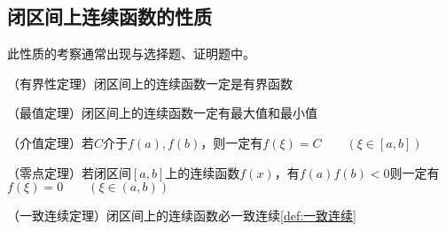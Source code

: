 \subsection{闭区间上连续函数的性质}
此性质的考察通常出现与选择题、证明题中。
\begin{theorem}
    （有界性定理）闭区间上的连续函数一定是有界函数
\end{theorem}
\begin{theorem}
    （最值定理）闭区间上的连续函数一定有最大值和最小值
\end{theorem}
\begin{theorem}
    （介值定理）若$C$介于$f(a),f(b)$，则一定有$f(\xi)=C \qquad (\xi\in[a,b])$
\end{theorem}
\begin{theorem}
    （零点定理）若闭区间$[a,b]$上的连续函数$f(x)$，有$f(a)f(b)<0$则一定有$f(\xi)=0 \qquad (\xi\in(a,b))$
\end{theorem}
\begin{theorem}
    （一致连续定理）闭区间上的连续函数必一致连续\ref{def:一致连续}
\end{theorem}

